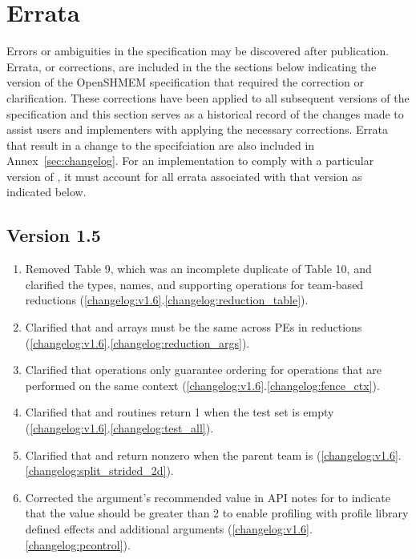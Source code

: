 \chapter{Errata}\label{sec:errata}

Errors or ambiguities in the \openshmem specification may be discovered after
publication.
Errata, or corrections, are included in the the sections below indicating the
version of the OpenSHMEM specification that required the correction or
clarification.
These corrections have been applied to all subsequent versions of the
specification and this section serves as a historical record of the changes
made to assist users and implementers with applying the necessary corrections.
Errata that result in a change to the specifciation are also included in
Annex~\ref{sec:changelog}.
For an implementation to comply with a particular version of \openshmem, it
must account for all errata associated with that version as indicated below.

\section{Version 1.5}

\begin{enumerate}
  \item Removed \openshmem[1.5] Table 9, which was an incomplete duplicate of
      \openshmem[1.5] Table 10, and clarified the types, names, and supporting
      operations for team-based reductions
        (\ref{changelog:v1.6}.\ref{changelog:reduction_table}).
  \item Clarified that  and  arrays must be the same
      across \acp{PE} in \openshmem reductions
        (\ref{changelog:v1.6}.\ref{changelog:reduction_args}).
  \item Clarified that  operations only guarantee ordering for operations
     that are performed on the same context
        (\ref{changelog:v1.6}.\ref{changelog:fence_ctx}).
  \item Clarified that  and
      routines return 1 when the test set is empty
        (\ref{changelog:v1.6}.\ref{changelog:test_all}).
  \item Clarified that  and
      return nonzero when the parent team is
        (\ref{changelog:v1.6}.\ref{changelog:split_strided_2d}).
  \item Corrected the  argument's recommended value in API notes for
      to indicate that the value should be greater than 2 to enable
     profiling with profile library defined effects and additional arguments
        (\ref{changelog:v1.6}.\ref{changelog:pcontrol}).
\end{enumerate}


